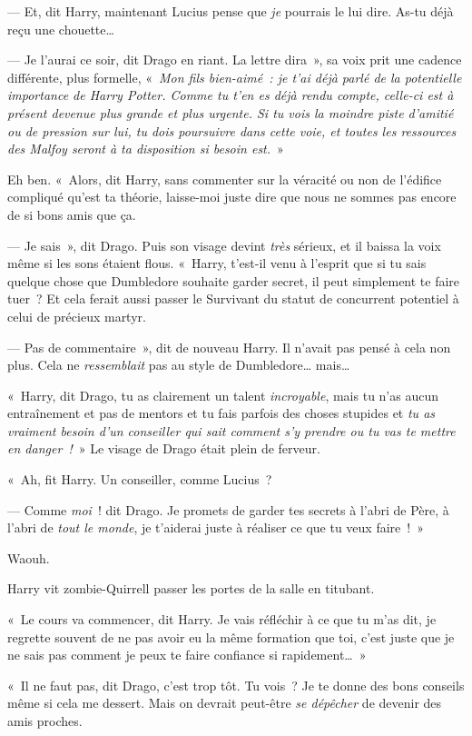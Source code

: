 --- Et, dit Harry, maintenant Lucius pense que \emph{je} pourrais le lui dire.
As-tu déjà reçu une chouette…

--- Je l'aurai ce soir, dit Drago en riant.
La lettre dira~», sa voix prit une cadence différente, plus formelle, «~\emph{Mon fils bien-aimé~: je t'ai déjà parlé de la potentielle importance de Harry Potter.
Comme tu t'en es déjà rendu compte, celle-ci est à présent devenue plus grande et plus urgente.
Si tu vois la moindre piste d'amitié ou de pression sur lui, tu dois poursuivre dans cette voie, et toutes les ressources des Malfoy seront à ta disposition si besoin est.}~»

Eh ben.
«~Alors, dit Harry, sans commenter sur la véracité ou non de l'édifice compliqué qu'est ta théorie, laisse-moi juste dire que nous ne sommes pas encore de si bons amis que ça.

--- Je sais~», dit Drago.
Puis son visage devint \emph{très} sérieux, et il baissa la voix même si les sons étaient flous.
«~Harry, t'est-il venu à l'esprit que si tu sais quelque chose que Dumbledore souhaite garder secret, il peut simplement te faire tuer~?
Et cela ferait aussi passer le Survivant du statut de concurrent potentiel à celui de précieux martyr.

--- Pas de commentaire~», dit de nouveau Harry.
Il n'avait pas pensé à cela non plus.
Cela ne \emph{ressemblait} pas au style de Dumbledore… mais…

«~Harry, dit Drago, tu as clairement un talent \emph{incroyable}, mais tu n'as aucun entraînement et pas de mentors et tu fais parfois des choses stupides et \emph{tu as vraiment besoin d'un conseiller qui sait comment s'y prendre ou tu vas te mettre en danger~!}~» Le visage de Drago était plein de ferveur.

«~Ah, fit Harry.
Un conseiller, comme Lucius~?

--- Comme \emph{moi}~! dit Drago.
Je promets de garder tes secrets à l'abri de Père, à l'abri de \emph{tout le monde}, je t'aiderai juste à réaliser ce que tu veux faire~!~»

Waouh.

Harry vit zombie-Quirrell passer les portes de la salle en titubant.

«~Le cours va commencer, dit Harry.
Je vais réfléchir à ce que tu m'as dit, je regrette souvent de ne pas avoir eu la même formation que toi, c'est juste que je ne sais pas comment je peux te faire confiance si rapidement…~»

«~Il ne faut pas, dit Drago, c'est trop tôt.
Tu vois~?
Je te donne des bons conseils même si cela me dessert.
Mais on devrait peut-être \emph{se dépêcher} de devenir des amis proches.

